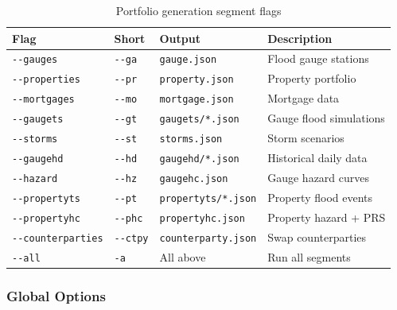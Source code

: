 \documentclass[11pt,a4paper]{article}
\begin{document}
\begin{table}[H]
    \centering
    \caption{Portfolio generation segment flags}
    \label{tab:port_segments}
    \begin{tabular}{@{}llll@{}}
        \toprule
        \textbf{Flag} & \textbf{Short} & \textbf{Output} & \textbf{Description} \\
        \midrule
        \texttt{-{}-gauges}        & \texttt{-{}-ga}  & \texttt{gauge.json}     & Flood gauge stations \\
        \texttt{-{}-properties}    & \texttt{-{}-pr}  & \texttt{property.json}  & Property portfolio \\
        \texttt{-{}-mortgages}     & \texttt{-{}-mo}  & \texttt{mortgage.json}  & Mortgage data \\
        \texttt{-{}-gaugets}       & \texttt{-{}-gt}  & \texttt{gaugets/*.json} & Gauge flood simulations \\
        \texttt{-{}-storms}        & \texttt{-{}-st}  & \texttt{storms.json}    & Storm scenarios \\
        \texttt{-{}-gaugehd}       & \texttt{-{}-hd}  & \texttt{gaugehd/*.json} & Historical daily data \\
        \texttt{-{}-hazard}        & \texttt{-{}-hz}  & \texttt{gaugehc.json}   & Gauge hazard curves \\
        \texttt{-{}-propertyts}    & \texttt{-{}-pt}  & \texttt{propertyts/*.json} & Property flood events \\
        \texttt{-{}-propertyhc}    & \texttt{-{}-phc} & \texttt{propertyhc.json} & Property hazard + PRS \\
        \texttt{-{}-counterparties}& \texttt{-{}-ctpy}& \texttt{counterparty.json} & Swap counterparties \\
        \texttt{-{}-all}           & \texttt{-a}      & All above                 & Run all segments \\
        \bottomrule
    \end{tabular}
\end{table}

\subsubsection{Global Options}
\end{document}
